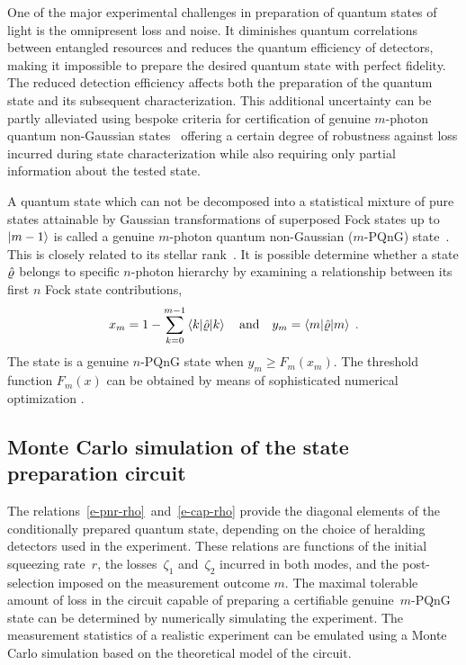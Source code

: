 \documentclass{article}
\begin{document}
One of the major experimental challenges in preparation of quantum states of light is the omnipresent loss and noise. It diminishes quantum correlations between entangled resources and reduces the quantum efficiency of detectors, making it impossible to prepare the desired quantum state with perfect fidelity. The reduced detection efficiency affects both the preparation of the quantum state and its subsequent characterization. This additional uncertainty can be partly alleviated using bespoke criteria for certification of genuine $m$-photon quantum non-Gaussian states~\cite{lachman2019} offering a certain degree of robustness against loss incurred during state characterization while also requiring only partial information about the tested state.

A quantum state which can not be decomposed into a statistical mixture of pure states attainable by Gaussian transformations of superposed Fock states up to ${\ket{m - 1}}$ is called a genuine $m$-photon quantum non-Gaussian ($m$-PQnG) state~\cite{lachman2019}. This is closely related to its stellar rank~\cite{chabaud2020,fiurasek2022}. It is possible determine whether a state $\hat{\varrho}$ belongs to specific $n$-photon hierarchy by examining a relationship between its first $n$ Fock state contributions,
%
\begin{equation}
  x_{m} 
    = 1 - \sum_{k = 0}^{m - 1} 
      \braket{k | \hat{\varrho} | k}
  \quad\text{and}\quad
  y_{m} = \braket{m | \hat{\varrho} | m}
  \;\text{.}
\end{equation}
%
The state is a genuine $n$-PQnG state when ${y_{m} \geq F_{m} (x_{m})}$. The threshold function $F_{m}(x)$ can be obtained by means of sophisticated numerical optimization \cite{lachman2019,fiurasek2022}.

%
%

\subsection*{Monte Carlo simulation of the state preparation circuit}

The relations~\eqref{e-pnr-rho}~and~\eqref{e-cap-rho} provide the diagonal elements of the conditionally prepared quantum state, depending on the choice of heralding detectors used in the experiment. These relations are functions of the initial squeezing rate~$r$, the losses~$\zeta_{1}$ and~$\zeta_{2}$ incurred in both modes, and the post-selection imposed on the measurement outcome $m$. The maximal tolerable amount of loss in the circuit capable of preparing a certifiable genuine~$m$-PQnG state can be determined by numerically simulating the experiment. The measurement statistics of a realistic experiment can be emulated using a Monte Carlo simulation based on the theoretical model of the circuit. 
\end{document}
